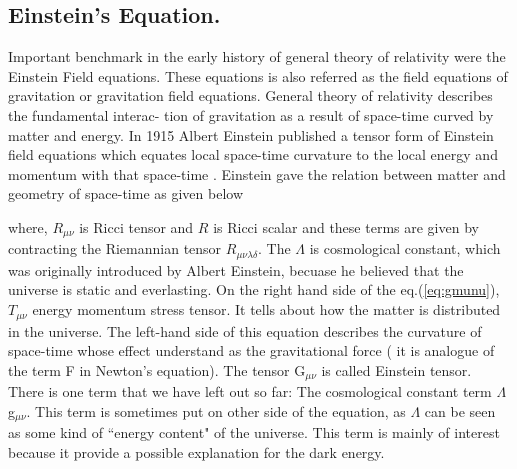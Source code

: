 \documentclass[12pt]{report}
\begin{document}
\subsection{Einstein's Equation.}
Important benchmark in the early history of general theory of relativity were the Einstein Field equations. These equations is also referred as the field equations of gravitation or gravitation field equations. General theory of relativity describes the fundamental interac- tion of gravitation as a result of space-time curved by matter and energy. In 1915 Albert Einstein published a tensor form of Einstein field equations which equates local space-time curvature to the local energy and momentum with that space-time \cite{ae1915}.
Einstein gave the relation between matter and geometry of space-time as given below
where, $R_{\mu\nu}$ is Ricci tensor and $R$ is Ricci scalar and these terms are given by contracting the Riemannian tensor $R_{\mu\nu\lambda\delta}$. The $\Lambda$ is cosmological constant, which was originally introduced by Albert Einstein, becuase he believed that the universe is static and everlasting. On the right hand side of the eq.(\ref{eq:gmunu}), $T_{\mu\nu}$  energy momentum stress tensor. It tells about how the matter is distributed in the universe. The left-hand side of this equation describes the curvature of space-time whose effect understand as the gravitational force ( it is analogue of the term F in Newton's equation). The tensor G$_{\mu\nu}$ is called Einstein tensor.  \\
There is one term that we have left out so far: The cosmological constant term $\Lambda$g$_{\mu\nu}$. This term is sometimes put on other side of the equation, as $\Lambda$ can be seen as some kind of ``energy content" of the universe. This term is mainly of interest because it provide a possible explanation for the dark energy\cite{ag1998,sp1998}.   \\
\end{document}
